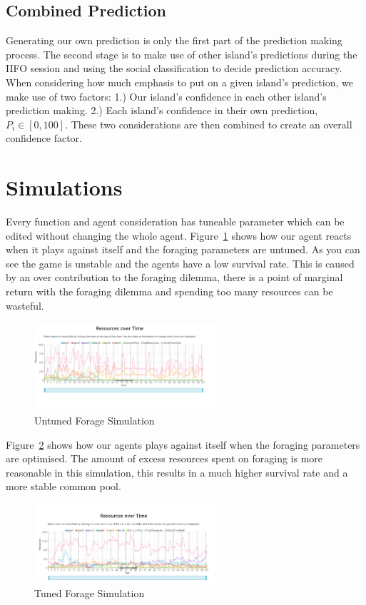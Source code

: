 \subsection{Combined Prediction}
Generating our own prediction is only the first part of the prediction making process. The second stage is to make use of other island's predictions during the IIFO session and using the social classification to decide prediction accuracy. When considering how much emphasis to put on a given island's prediction, we make use of two factors: 1.) Our island's confidence in each other island's prediction making. 2.) Each island's confidence in their own prediction, $P_i \in [0,100]$. These two considerations are then combined to create an overall confidence factor.

\section{Simulations}
Every function and agent consideration has tuneable parameter which can be edited without changing the whole agent. Figure~\ref{fig: Forage Untuned} shows how our agent reacts when it plays against itself and the foraging parameters are untuned. As you can see the game is unstable and the agents have a low survival rate. This is caused by an over contribution to the foraging dilemma, there is a point of marginal return with the foraging dilemma and spending too many resources can be wasteful. 

\begin{figure}[!htb]
    \centering
    \includegraphics[width=0.6\textwidth]{images/Forage Untuned.png}
    \caption{Untuned Forage Simulation}
    \label{fig: Forage Untuned}
\end{figure}

Figure~\ref{fig: Forage tuned} shows how our agents plays against itself when the foraging parameters are optimised. The amount of excess resources spent on foraging is more reasonable in this simulation, this results in a much higher survival rate and a more stable common pool.

\begin{figure}[!htb]
    \centering
    \includegraphics[width=0.6\textwidth]{images/Forage tuned.png}
    \caption{Tuned Forage Simulation}
    \label{fig: Forage tuned}
\end{figure}

